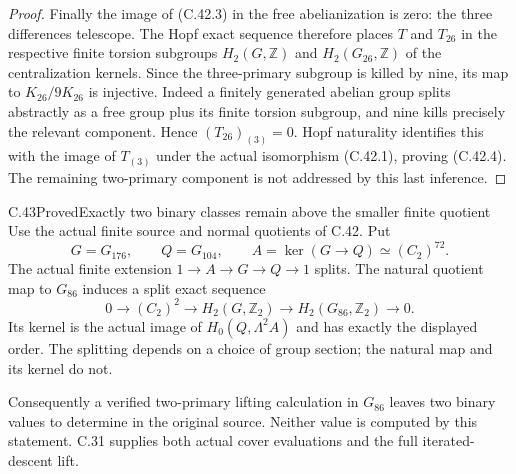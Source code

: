 \begin{proof}
Finally the image of (C.42.3) in the free abelianization is zero:
the three differences telescope.  The Hopf exact sequence therefore
places $T$ and $T_{26}$ in the respective finite torsion subgroups
$H_2(G,\mathbb Z)$ and $H_2(G_{26},\mathbb Z)$ of the centralization
kernels.  Since the three-primary subgroup is killed by nine, its
map to $K_{26}/9K_{26}$ is injective.  Indeed a finitely generated
abelian group splits abstractly as a free group plus its finite
torsion subgroup, and nine kills precisely the relevant component.
Hence $(T_{26})_{(3)}=0$.  Hopf naturality identifies this with the
image of $T_{(3)}$ under the actual isomorphism (C.42.1), proving
(C.42.4).  The remaining two-primary component is not addressed
by this last inference.
\end{proof}


\begin{statement}{C.43}{Proved}{Exactly two binary classes remain above the smaller finite quotient}
Use the actual finite source and normal quotients of C.42.  Put
\[
 G=G_{176},\qquad Q=G_{104},\qquad
 A=\ker(G\to Q)\simeq(C_2)^{72}.
\]
The actual finite extension $1\to A\to G\to Q\to1$ splits.
The natural quotient map to $G_{86}$ induces a split exact sequence
\[
 0\longrightarrow(C_2)^2\longrightarrow H_2(G,\mathbb Z_2)
   \longrightarrow H_2(G_{86},\mathbb Z_2)\longrightarrow0.
 \tag{C.43.1}
\]
Its kernel is the actual image of
$H_0(Q,\Lambda^2A)$ and has exactly the displayed order.
The splitting depends on a choice of group section; the natural map
and its kernel do not.

Consequently a verified two-primary lifting calculation in $G_{86}$
leaves two binary values to determine in the original source.
Neither value is computed by this statement. C.31 supplies both
actual cover evaluations and the full iterated-descent lift.
\end{statement}

